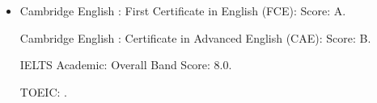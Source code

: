 %
\begin{itemize}
    \setlength\itemsep{2em} %
    \iftrue
    \item {}
    \begin{itemize}%
        \iftrue
         Cambridge English : First Certificate in English (FCE): Score: A.
        \fi
        \iftrue
         Cambridge English : Certificate in Advanced English (CAE): Score: B.
        \fi
        \iftrue
         IELTS Academic: Overall Band Score: 8.0.
        \fi
        \iftrue
         TOEIC: .
        \fi
%
    \end{itemize}%
    \fi
\end{itemize}